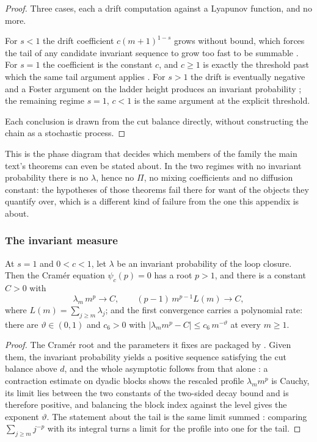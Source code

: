 \begin{proof}
  \leanok
Three cases, each a drift computation against a Lyapunov function, and no more.

For $s<1$ the drift coefficient $c(m+1)^{1-s}$ grows without bound, which forces the tail of
any candidate invariant sequence to grow too fast to be summable
. For $s=1$ the coefficient is the constant
$c$, and $c\geq1$ is exactly the threshold past which the same tail argument applies
. For $s>1$ the drift is eventually
negative and a Foster argument on the ladder height produces an invariant probability
; the remaining regime $s=1$, $c<1$ is the
same argument at the explicit threshold.

Each conclusion is drawn from the cut balance directly, without constructing the chain as a
stochastic process.
\end{proof}

\noindent This is the phase diagram that decides which members of the family the main text's theorems can
even be stated about. In the two regimes with no invariant probability there is no $\lambda$,
hence no $\Pi$, no mixing coefficients and no diffusion constant: the hypotheses of those
theorems fail there for want of the objects they quantify over, which is a different kind of
failure from the one this appendix is about.


\subsubsection{The invariant measure}


\begin{theorem}
  \label{thm:main_invariant_measure}
  \leanok
At $s=1$ and $0<c<1$, let $\lambda$ be an invariant probability of the loop closure. Then the
Cram\'er equation $\psi_c(p)=0$ has a root $p>1$, and there is a constant $C>0$ with
\[ \lambda_m\,m^{p}\longrightarrow C, \qquad (p-1)\,m^{p-1}L(m)\longrightarrow C, \]
where $L(m)=\sum_{j\geq m}\lambda_j$; and the first convergence carries a polynomial rate:
there are $\vartheta\in(0,1)$ and $c_6>0$ with $|\lambda_m m^{p}-C|\leq c_6\,m^{-\vartheta}$ at
every $m\geq1$.
\end{theorem}

\begin{proof}
  \leanok
The Cram\'er root and the parameters it fixes are packaged by .
Given them, the invariant probability yields a positive sequence satisfying the cut balance
above $d$, and the whole asymptotic follows from that alone
: a contraction estimate on dyadic blocks shows the
rescaled profile $\lambda_m m^{p}$ is Cauchy, its limit lies between the two constants of the
two-sided decay bound and is therefore positive, and balancing the block index against the
level gives the exponent $\vartheta$. The statement about the tail is the same limit summed
: comparing $\sum_{j\geq m}j^{-p}$ with its
integral turns a limit for the profile into one for the tail.
\end{proof}

